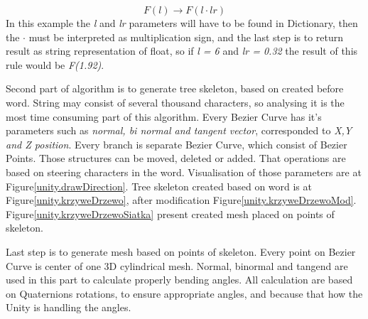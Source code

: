 \documentclass[b5paper,twoside,11pt]{article}
\renewcommand{\figurename}{Figure}
\begin{document}
  \begin{equation*}
  F(l) \rightarrow F(l \cdot lr)
  \end{equation*}
  In this example the \textit{l} and \textit{lr} parameters will have to be found in Dictionary, then the $ \cdot$ must be interpreted as multiplication sign, and the last step is to return result as string representation of float, so if \textit{l = 6} and \textit{lr = 0.32} the result of this rule would be \textit{F(1.92)}.\par
Second part of algorithm is to generate tree skeleton, based on created before word. String may consist of several thousand characters, so analysing it is the most time consuming part of this algorithm.
Every Bezier Curve has it's parameters such as \textit{normal, bi normal and tangent vector}, corresponded to \textit{X,Y and Z position}. Every branch is separate Bezier Curve, which consist of Bezier Points. Those structures can be moved, deleted or added. That operations are based on steering characters in the word.
Visualisation of those parameters are at \figurename\ref{unity.drawDirection}. Tree skeleton created based on word is at \figurename\ref{unity.krzyweDrzewo}, after modification  \figurename\ref{unity.krzyweDrzewoMod}. \figurename\ref{unity.krzyweDrzewoSiatka} present created mesh placed on points of skeleton.
\par
Last step is to generate  mesh based on points of skeleton. Every point on Bezier Curve is center of one 3D cylindrical mesh. Normal, binormal and tangend are used in this part to calculate properly bending angles.
All calculation are based on Quaternions rotations, to ensure appropriate angles, and because that how the Unity is handling the angles.
\end{document}
